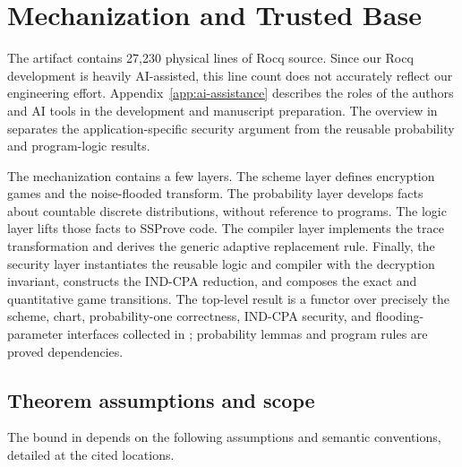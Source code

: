 \section{Mechanization and Trusted Base}
\label{sec:artifact}

The artifact contains 27,230 physical lines of Rocq source.
Since our Rocq development is heavily AI-assisted,
this line count does not accurately reflect our engineering effort.
Appendix~\ref{app:ai-assistance} describes the roles of the authors and AI tools in
the development and manuscript preparation.
The overview in  separates the application-specific
security argument from the reusable probability and program-logic results.

The mechanization contains a few layers.  The scheme layer
defines encryption games and the noise-flooded transform.  The
probability layer develops facts about countable discrete distributions,
without reference to programs.  The logic layer lifts those facts to SSProve
code.  The compiler layer implements the trace transformation and derives the
generic adaptive replacement rule.  Finally, the security
layer instantiates the reusable logic and compiler with the decryption
invariant, constructs the IND-CPA reduction, and composes the exact and
quantitative game transitions.
The top-level result is a functor over precisely the scheme, chart,
probability-one correctness, IND-CPA security, and flooding-parameter
interfaces collected in ; probability lemmas and
program rules are proved dependencies.

\subsection{Theorem assumptions and scope}
\label{sec:assumptions}

The bound in  depends on the following assumptions and semantic
conventions, detailed at the cited locations.

